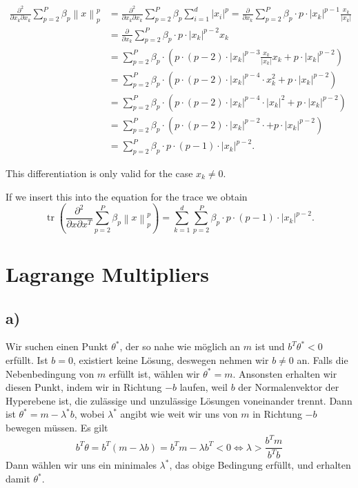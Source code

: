 \documentclass[paper=a4,fontsize=10pt,DIV11,BCOR10mm]{scrartcl}
\newcommand{\norm}[1]{\left\lVert#1\right\rVert}
\DeclareMathOperator{\tr}{tr}
\begin{document}
\begin{align*}
\frac{\partial^2}{\partial x_k\partial x_k} \sum_{p=2}^P \beta_p \norm{x}_p^p &=\frac{\partial^2}{\partial x_k\partial x_k}\sum_{p=2}^P \beta_p \sum_{i=1}^d \lvert x_i \rvert^p =\frac{\partial}{\partial x_k}\sum_{p=2}^P \beta_p \cdot p \cdot \lvert x_k\rvert^{p-1} \frac{x_k}{\lvert x_k\rvert}\\
&=\frac{\partial}{\partial x_k}\sum_{p=2}^P \beta_p \cdot  p \cdot \lvert x_k\rvert^{p-2} x_k \\
&=\sum_{p=2}^P \beta_p \cdot  ( p \cdot (p-2) \cdot \lvert x_k\rvert^{p-3}\frac{x_k}{\lvert x_k\rvert}  x_k +p \cdot \lvert x_k\rvert^{p-2})\\
&=\sum_{p=2}^P \beta_p \cdot ( p \cdot (p-2) \cdot \lvert x_k\rvert^{p-4}\cdot x_k^2 +p \cdot \lvert x_k\rvert^{p-2})\\
&= \sum_{p=2}^P \beta_p \cdot ( p \cdot (p-2) \cdot \lvert x_k\rvert^{p-4}\cdot \lvert x_k \rvert^2 +p \cdot \lvert x_k\rvert^{p-2})\\
&= \sum_{p=2}^P \beta_p \cdot ( p \cdot (p-2) \cdot \lvert x_k\rvert^{p-2}\cdot +p \cdot \lvert x_k\rvert^{p-2})\\
&= \sum_{p=2}^P \beta_p \cdot  p \cdot (p-1) \cdot \lvert x_k\rvert^{p-2}\text{.}
\end{align*}

This differentiation is only valid for the case $x_k \neq 0$.

If we insert this into the equation for the trace we obtain
\begin{equation*}
\tr(\frac{\partial^2}{\partial x\partial x^T} \sum_{p=2}^P \beta_p \norm{x}_p^p ) = \sum\limits_{k=1}^{d}\sum_{p=2}^P \beta_p \cdot  p \cdot (p-1) \cdot \lvert x_k\rvert^{p-2}\text{.}
\end{equation*}


\section{Lagrange Multipliers}

\subsection*{a)}

Wir suchen einen Punkt $\theta^*$, der so nahe wie möglich an $m$ ist und $b^T \theta^* < 0$ erfüllt. Ist $b = 0$, existiert keine Lösung, deswegen nehmen wir $b \neq 0$ an. Falls die Nebenbedingung von $m$ erfüllt ist, wählen wir $\theta^* = m$. Ansonsten erhalten wir diesen Punkt, indem wir in Richtung $-b$ laufen, weil $b$ der Normalenvektor der Hyperebene ist, die zulässige und unzulässige Lösungen voneinander trennt. Dann ist $\theta^* = m - \lambda^* b$, wobei $\lambda^*$ angibt wie weit wir uns von $m$ in Richtung $-b$ bewegen müssen. Es gilt
\[ b^T \theta = b^T (m - \lambda b) = b^T m - \lambda b^T < 0 \Leftrightarrow \lambda > \frac{b^T m}{b^T b} \]
Dann wählen wir uns ein minimales $\lambda^*$, das obige Bedingung erfüllt, und erhalten damit $\theta^*$.
\end{document}
